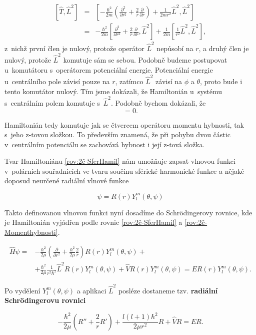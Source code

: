 \begin{eqnarray}
\left[\hat{T},\hat{L}^{2}\right] &=& \left[-\frac{\hbar^{2}}{2m}\left(\frac{\partial^{2}}{\partial r^{2}}+\frac{2}{r}\frac{\partial}{\partial r}\right)+\frac{1}{2mr^{2}}\hat{L}^2,\hat{L}^2\right] \nonumber\\
&=& -\frac{\hbar^2}{2m}\left[\frac{\partial^{2}}{\partial r^{2}}+\frac{2}{r}\frac{\partial}{\partial r},\hat{L}^2\right]+\frac{1}{2m}\left[\frac{1}{r^2}\hat{L}^2,\hat{L}^2\right],
\label{rov:2č-komutatorT}
\end{eqnarray}
z~nichž první člen je nulový, protože operátor $\hat{L}^{2}$ nepůsobí na  $ r $, a druhý člen je nulový, protože $ \hat{L}^2 $ komutuje sám se sebou. Podobně budeme postupovat u~komutátoru s~operátorem potenciální energie. Potenciální energie u~centrálního pole závisí pouze na $r$, zatímco $\hat{L}^2$ závisí na $ \phi $ a $ \theta $, proto bude i tento komutátor nulový.  Tím jsme dokázali, že Hamiltonián u~systému s~centrálním polem komutuje s~$\hat{L}^2$. Podobně bychom dokázali, že
\begin{equation}
[\hat{H},L_{z}]=0.
\end{equation}
 
Hamiltonián tedy komutuje jak se čtvercem operátoru momentu hybnosti, tak s~jeho z-tovou složkou. To především znamená, že při pohybu dvou částic v~centrálním potenciálu se zachovává hybnost i její z-tová složka. 


Tvar Hamiltoniánu \eqref{rov:2č-SferHamil} nám umožňuje zapsat vlnovou funkci v~polárních souřadnicích ve tvaru součinu sférické harmonické funkce a nějaké doposud neurčené radiální vlnové funkce

\begin{equation}
\psi=R(r)Y^m_l(\theta,\psi)
\end{equation}

Takto definovanou vlnovou funkci nyní dosadíme do Schr\"odingerovy rovnice, kde je Hamiltonián vyjádřen podle rovnic \eqref{rov:2č-SferHamil} a \eqref{rov:2č-Momenthybnosti}.

\begin{equation}
\begin{split}
\hat{H}\psi= & -\frac{\hbar^2}{2\mu}\left(\frac{\partial}{\partial r^2} +\frac{\hbar^2}{2\mu}\frac{2}{r}\right)R(r)Y^m_l(\theta,\psi) + \\
& +\frac{\hbar^2}{2\mu}\frac{1}{r^2\hbar^2}\hat{L}^2R(r)Y^m_l(\theta,\psi)+\hat{V}R(r)Y^m_l(\theta,\psi)=ER(r)Y^m_l(\theta,\psi).
\end{split}
\end{equation}

Po vydělení $ Y^m_l(\theta,\psi) $ a aplikaci $ \hat{L}^2 $ posléze dostaneme tzv. \textbf{radiální Schr\"odingerovu rovnici}

\begin{equation}
\boxed{-\frac{\hbar^2}{2\mu}\left(R''+\frac{2}{r}R'\right)+\frac{l\left(l+1\right)\hbar^2}{2\mu r^2}R+\hat{V}R=ER.}
\label{rov:Radialni SCHR}
\end{equation}













